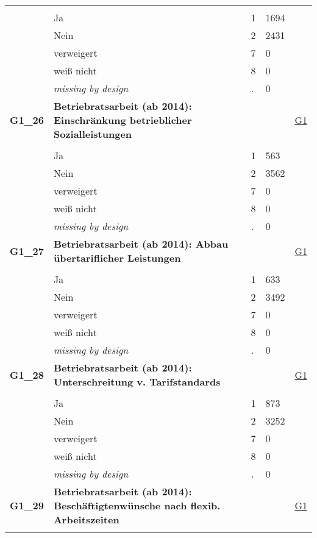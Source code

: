 \begin{longtable}{| L{2.65cm} | L{8cm} | C{1.5cm} | R{1.25cm} | C{2.25cm}  |}
   &  &  &  &  \\ 
   & Ja & 1 & 1694 &  \\ 
   & Nein & 2 & 2431 &  \\ 
   & verweigert & 7 & 0 &  \\ 
   & weiß nicht & 8 & 0 &  \\ 
   & \textit{missing by design} & \textit{.} & 0 &  \\ 
   \midrule
\textbf{G1\_26}\label{var:G1:26} & \textbf{Betriebratsarbeit (ab 2014): Einschränkung betrieblicher Sozialleistungen} &  &  & \hyperref[G1]{G1} \\ 
   &  &  &  &  \\ 
   & Ja & 1 & 563 &  \\ 
   & Nein & 2 & 3562 &  \\ 
   & verweigert & 7 & 0 &  \\ 
   & weiß nicht & 8 & 0 &  \\ 
   & \textit{missing by design} & \textit{.} & 0 &  \\ 
   \midrule
\textbf{G1\_27}\label{var:G1:27} & \textbf{Betriebratsarbeit (ab 2014): Abbau übertariflicher Leistungen} &  &  & \hyperref[G1]{G1} \\ 
   &  &  &  &  \\ 
   & Ja & 1 & 633 &  \\ 
   & Nein & 2 & 3492 &  \\ 
   & verweigert & 7 & 0 &  \\ 
   & weiß nicht & 8 & 0 &  \\ 
   & \textit{missing by design} & \textit{.} & 0 &  \\ 
   \midrule
\textbf{G1\_28}\label{var:G1:28} & \textbf{Betriebratsarbeit (ab 2014): Unterschreitung v. Tarifstandards} &  &  & \hyperref[G1]{G1} \\ 
   &  &  &  &  \\ 
   & Ja & 1 & 873 &  \\ 
   & Nein & 2 & 3252 &  \\ 
   & verweigert & 7 & 0 &  \\ 
   & weiß nicht & 8 & 0 &  \\ 
   & \textit{missing by design} & \textit{.} & 0 &  \\ 
   \midrule
\textbf{G1\_29}\label{var:G1:29} & \textbf{Betriebratsarbeit (ab 2014): Beschäftigtenwünsche nach flexib. Arbeitszeiten} &  &  & \hyperref[G1]{G1} \\ 
   &  &  &  &  \\ 

\end{longtable}
